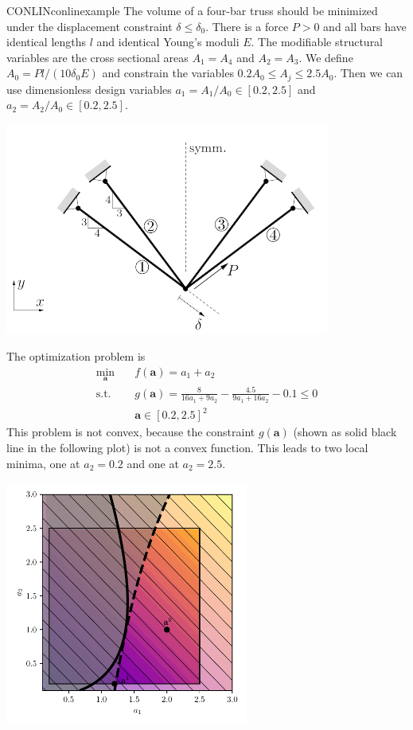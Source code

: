 \begin{example}{CONLIN}{conlinexample}
    The volume of a four-bar truss \cite{Christensen2008} should be minimized under the displacement constraint $\delta \le \delta_0$. There is a force $P>0$ and all bars have identical lengths $l$ and identical Young's moduli $E$. The modifiable structural variables are the cross sectional areas $A_1=A_4$ and $A_2=A_3$. We define $A_0 = Pl / (10\delta_0E)$ and constrain the variables $0.2A_0 \le A_j \le 2.5 A_0$. Then we can use dimensionless design variables $a_1=A_1/A_0 \in [0.2, 2.5]$ and $a_2=A_2/A_0 \in [0.2, 2.5]$.
    \begin{center}
        \includegraphics[width=0.8\textwidth]{figures/four_bar_truss_transparent.png}
    \end{center}
    The optimization problem is 
    \begin{equation}
        \begin{aligned}
            \min_{\mathbf{a}} \quad & f(\mathbf{a})= a_1 + a_2\\
            \textrm{s.t.} \quad     & g(\mathbf{a}) = \frac{8}{16a_1+9a_2} - \frac{4.5}{9a_1+16a_2} -0.1 \le 0  \\
            \quad     & \mathbf{a} \in [0.2,2.5]^2
        \end{aligned}
    \end{equation}
    This problem is not convex, because the constraint $g(\mathbf{a})$ (shown as solid black line in the following plot) is not a convex function. This leads to two local minima, one at $a_2=0.2$ and one at $a_2=2.5$.
    \begin{center}
        \includegraphics[width=0.6\textwidth]{figures/four_bar_example_0.pdf}
    \end{center}
    

\end{example}
